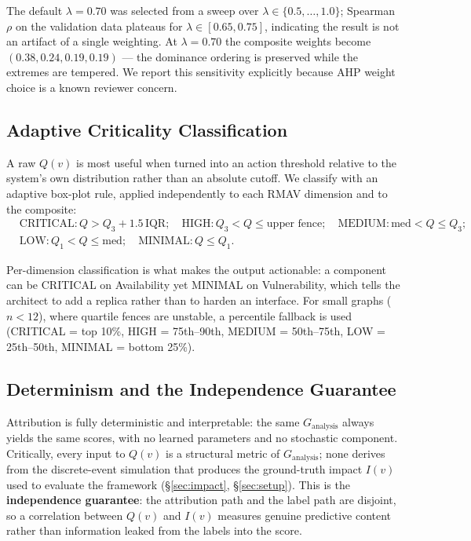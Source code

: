 \documentclass[review]{elsarticle}
\begin{document}
The default $\lambda = 0.70$ was selected from a sweep over $\lambda\in\{0.5,\dots,1.0\}$; Spearman
$\rho$ on the validation data plateaus for $\lambda\in[0.65,0.75]$, indicating the result is not an
artifact of a single weighting. At $\lambda = 0.70$ the composite weights become $(0.38, 0.24, 0.19,
0.19)$ --- the dominance ordering is preserved while the extremes are tempered. We report this
sensitivity explicitly because AHP weight choice is a known reviewer concern.

\subsection{Adaptive Criticality Classification}

A raw $Q(v)$ is most useful when turned into an action threshold relative to the system's own
distribution rather than an absolute cutoff. We classify with an adaptive box-plot rule, applied
independently to each RMAV dimension and to the composite:
\begin{align}
&\text{CRITICAL}: Q > Q_3 + 1.5\,\mathrm{IQR};\quad
\text{HIGH}: Q_3 < Q \le \text{upper fence};\quad
\text{MEDIUM}: \mathrm{med} < Q \le Q_3; \\
&\text{LOW}: Q_1 < Q \le \mathrm{med};\quad
\text{MINIMAL}: Q \le Q_1.
\end{align}

Per-dimension classification is what makes the output actionable: a component can be CRITICAL on
Availability yet MINIMAL on Vulnerability, which tells the architect to add a replica rather than to
harden an interface. For small graphs ($n<12$), where quartile fences are unstable, a percentile
fallback is used (CRITICAL = top 10\%, HIGH = 75th--90th, MEDIUM = 50th--75th, LOW = 25th--50th,
MINIMAL = bottom 25\%).

\subsection{Determinism and the Independence Guarantee}

Attribution is fully deterministic and interpretable: the same $G_{\text{analysis}}$ always yields
the same scores, with no learned parameters and no stochastic component. Critically, every input to
$Q(v)$ is a structural metric of $G_{\text{analysis}}$; none derives from the discrete-event
simulation that produces the ground-truth impact $I(v)$ used to evaluate the framework
(\S\ref{sec:impact}, \S\ref{sec:setup}). This is the \textbf{independence guarantee}: the attribution
path and the label path are disjoint, so a correlation between $Q(v)$ and $I(v)$ measures genuine
predictive content rather than information leaked from the labels into the score.
\end{document}
